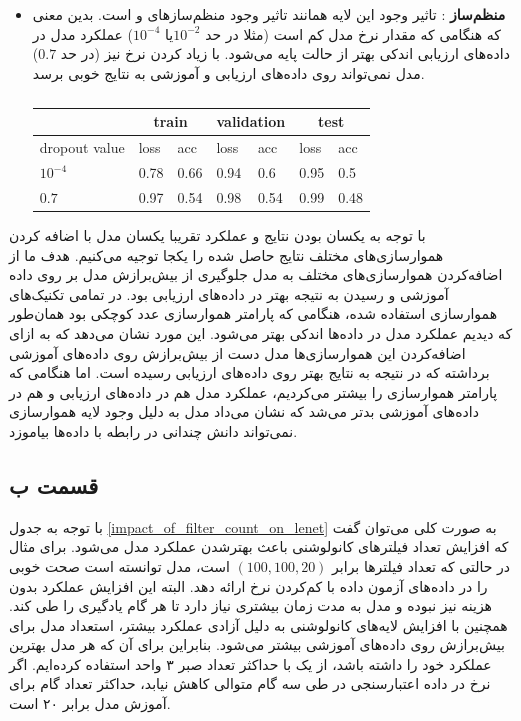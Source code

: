\documentclass[12pt, a4paper]{article}
\begin{document}
\begin{itemize}
    \item \textbf{منظم‌ساز }: تاثیر وجود این لایه همانند تاثیر وجود منظم‌ساز‌های  و  است. بدین
    معنی که هنگامی که مقدار نرخ  مدل کم است (مثلا در حد $10^{-2}$یا $10^{-4}$) عملکرد مدل در داده‌های ارزیابی
    اندکی بهتر از حالت پایه می‌شود. با زیاد کردن نرخ  نیز (در حد $0.7$) مدل نمی‌تواند روی داده‌های ارزیابی و آموزشی به نتایج خوبی برسد.
    \begin{latin}
    \begin{table}[h]
        \centering
        \caption{}
        \label{lenet_dropout_reg}
        \begin{tabular}{l|l|l||l|l||l|l}
            & \multicolumn{2}{c||}{train} & \multicolumn{2}{c||}{validation} & \multicolumn{2}{c}{test}\\ \hline
            dropout value & loss & acc & loss & acc & loss & acc\\ \hline
            $10^{-4}$ & 0.78 & 0.66 & 0.94 & 0.6 & 0.95 & 0.5\\
            $0.7$ & 0.97 & 0.54 & 0.98 & 0.54 & 0.99 & 0.48
        \end{tabular}
    \end{table}
    \end{latin}

\end{itemize}

با توجه به یکسان بودن نتایج و عملکرد تقریبا یکسان مدل با اضافه کردن هموار‌سازی‌های مختلف نتایج حاصل شده را یکجا توجیه می‌کنیم.
هدف ما از اضافه‌کردن هموار‌سازی‌های مختلف به مدل جلوگیری از بیش‌برازش مدل‌ بر روی داده آموزشی و رسیدن به نتیجه بهتر در
داده‌های ارزیابی بود. در تمامی تکنیک‌های هموار‌سازی استفاده شده، هنگامی که پارامتر هموار‌سازی عدد کوچکی بود همان‌طور که دیدیم
عملکرد مدل در داده‌ها اندکی بهتر می‌شود. این مورد نشان می‌دهد که
به ازای اضافه‌کردن این هموار‌سازی‌ها مدل دست از بیش‌برازش روی داده‌های آموزشی برداشته که در نتیجه به نتایج بهتر روی داده‌های
ارزیابی رسیده است. اما هنگامی که پارامتر هموارسازی را بیشتر می‌کردیم،‌ عملکرد مدل هم در داده‌های ارزیابی و هم در داده‌های
آموزشی بدتر می‌شد که نشان می‌داد مدل به دلیل وجود لایه هموار‌سازی نمی‌تواند دانش چندانی در رابطه با داده‌ها بیاموزد.

\subsection*{قسمت ب}

با توجه به جدول \ref{impact_of_filter_count_on_lenet} به صورت کلی می‌توان گفت که افزایش تعداد فیلتر‌های کانولوشنی
باعث بهترشدن عملکرد مدل می‌شود. برای مثال در حالتی که تعداد فیلتر‌ها برابر $(100,100,20)$ است، مدل توانسته است
صحت خوبی را در داده‌های آزمون داده با کم‌کردن نرخ  ارائه دهد. البته این افزایش عملکرد بدون هزینه نیز نبوده و
مدل به مدت زمان بیشتری نیاز دارد تا هر گام یادگیری را طی کند. همچنین با افزایش لایه‌های کانولوشنی به دلیل
آزادی عملکرد بیشتر، استعداد مدل برای بیش‌برازش روی داده‌های آموزشی بیشتر می‌شود. بنابراین برای آن که هر مدل
بهترین عملکرد خود را داشته باشد، از یک  با حداکثر تعداد صبر ۳ واحد استفاده کرده‌ایم.
اگر نرخ  در داده اعتبارسنجی در طی سه گام متوالی کاهش نیابد، حداکثر تعداد گام برای آموزش مدل
برابر ۲۰ است.
\end{document}
